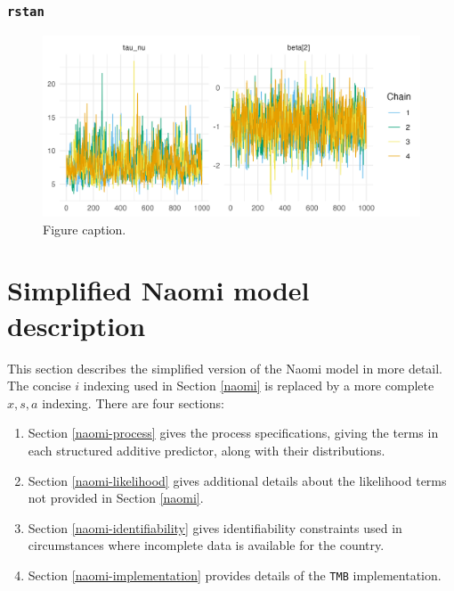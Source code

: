 \documentclass[a4paper, nobind]{templates/ociamthesis}
\providecommand{\tightlist}{%
  \setlength{\itemsep}{0pt}\setlength{\parskip}{0pt}}
\begin{document}
\hypertarget{rstan-epil}{%
\subsubsection{\texorpdfstring{\texttt{rstan}}{rstan}}\label{rstan-epil}}



\begin{figure}
\includegraphics[width=0.95\linewidth]{figures/naomi-aghq/stan-epil} \caption{Figure caption.}\label{fig:stan-epil}
\end{figure}

\hypertarget{naomi-math}{%
\section{Simplified Naomi model description}\label{naomi-math}}

This section describes the simplified version of the Naomi model \autocite{eaton2021naomi} in more detail.
The concise \(i\) indexing used in Section \ref{naomi} is replaced by a more complete \(x, s, a\) indexing.
There are four sections:

\begin{enumerate}
\def\labelenumi{\arabic{enumi}.}
\tightlist
\item
  Section \ref{naomi-process} gives the process specifications, giving the terms in each structured additive predictor, along with their distributions.
\item
  Section \ref{naomi-likelihood} gives additional details about the likelihood terms not provided in Section \ref{naomi}.
\item
  Section \ref{naomi-identifiability} gives identifiability constraints used in circumstances where incomplete data is available for the country.
\item
  Section \ref{naomi-implementation} provides details of the \texttt{TMB} implementation.
\end{enumerate}
\end{document}
